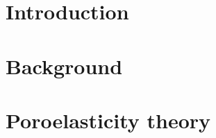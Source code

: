 \documentclass[letterpaper,12pt]{report}
\begin{document}
\def\localpath{contents/frontmatter}



\tableofcontents
\newpage







%




\chapter{Introduction}

 
\chapter{Background}


\chapter{Poroelasticity theory}

\end{document}
